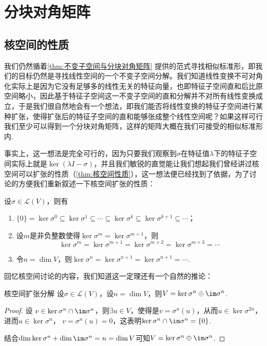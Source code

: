 \section{分块对角矩阵}

\subsection{核空间的性质}

我们仍然循着\autoref{thm:不变子空间与分块对角矩阵} 提供的范式寻找相似标准形，即我们的目标仍然是寻找线性空间的一个不变子空间分解。我们知道线性变换不可对角化实际上是因为它没有足够多的线性无关的特征向量，也即特征子空间直和后比原空间略小，因此基于特征子空间这一不变子空间的直和分解并不对所有线性变换成立，于是我们很自然地会有一个想法，即我们能否将线性变换的特征子空间进行某种扩张，使得扩张后的特征子空间的直和能够张成整个线性空间呢？如果这样可行我们至少可以得到一个分块对角矩阵，这样的矩阵大概在我们可接受的相似标准形内.

事实上，这一想法是完全可行的，因为只要我们观察到$\sigma$在特征值$\lambda$下的特征子空间实际上就是$\ker(\lambda I-\sigma)$，并且我们敏锐的直觉能让我们想起我们曾经讲过核空间可以扩张的性质（\autoref{thm:核空间性质}），这一想法便已经找到了依据，为了讨论的方便我们重新叙述一下核空间扩张的性质：
\begin{theorem}{}{}
    设$\sigma\in \mathcal{L}(V)$，则有
    \begin{enumerate}
        \item $\{0\}=\ker \sigma^0\subseteq\ker \sigma^1\subseteq\cdots\subseteq\ker \sigma^k\subseteq\ker \sigma^{k+1}\subseteq\cdots$；

        \item 设$m$是非负整数使得$\ker \sigma^m=\ker \sigma^{m+1}$，则
              \[\ker \sigma^m=\ker \sigma^{m+1}=\ker \sigma^{m+2}=\ker \sigma^{m+3}=\cdots\]

        \item 令$n=\dim V$，则$\ker \sigma^n=\ker \sigma^{n+1}=\ker \sigma^{n+1}=\cdots$.
    \end{enumerate}
\end{theorem}

回忆核空间讨论的内容，我们知道这一定理还有一个自然的推论：
\begin{theorem}{}{核空间扩张分解}
    设$\sigma\in\mathcal{L}(V)$，设$n=\dim V$，则$V=\ker \sigma^n\oplus \im \sigma^n$.
\end{theorem}
\begin{proof}
    设 $v \in \ker \sigma^n \cap \im \sigma^n$，则$\exists u \in V$，使得$是v=\sigma^n(u)$，从而$u \in \ker \sigma^{2n}$，进而$u \in \ker \sigma^{n}$， $v=\sigma^n(u)=0$，这表明$\ker \sigma^n \cap \im \sigma^n=\{0\}$.

    结合$\dim \ker\sigma^n+\dim \im\sigma^n=n=\dim V$可知$V=\ker\sigma^n\oplus\im\sigma^n$.
\end{proof}

